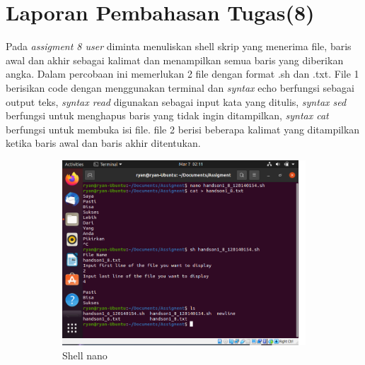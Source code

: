 \documentclass[11pt,a4paper]{article}
\begin{document}
\section{Laporan Pembahasan Tugas(8)}
    Pada \textit{assigment 8 user} diminta menuliskan shell skrip yang menerima file, baris awal dan akhir sebagai kalimat dan menampilkan semua baris yang diberikan angka. Dalam percobaan ini memerlukan 2 file dengan format .sh dan .txt. File 1 berisikan code dengan menggunakan terminal dan \textit{syntax} echo berfungsi sebagai output teks, \textit{syntax read} digunakan sebagai input kata yang ditulis, \textit{syntax sed} berfungsi untuk menghapus baris yang tidak ingin ditampilkan, \textit{syntax cat} berfungsi untuk membuka isi file. file 2 berisi beberapa kalimat yang ditampilkan ketika baris awal dan baris akhir ditentukan.
    \begin{figure}[h]
	\centering
	\begin{subfigure}[b]{0.4\textwidth}
		\centering
		\def\svgwidth{\columnwidth}
		\includegraphics[width=1\textwidth]{Gambar/Assigment 8 command.png}
		\caption{Shell nano}
		\label{fig:aug-1}
	\end{subfigure}
	\qquad %
	\begin{subfigure}[b]{0.4\textwidth}
		\centering
		\def\svgwidth{\columnwidth}

\end{subfigure}
\end{figure}
\end{document}
